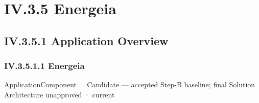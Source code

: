 \section*{IV.3.5 Energeia}
\label{navigation:IV.3.5}

\subsection*{IV.3.5.1 Application Overview}
\label{navigation:IV.3.5.1}

\subsubsection*{IV.3.5.1.1 Energeia}
\label{navigation:IV.3.5.1.1}

\label{element:fb3f37a6ac614415ac486a6de9d35994}
{\small ApplicationComponent · Candidate — accepted Step-B baseline; final Solution Architecture unapproved · current}\par

